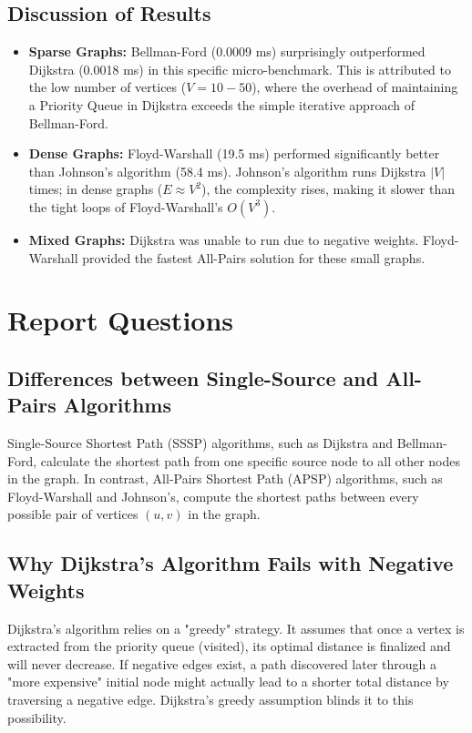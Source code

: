 \documentclass[12pt, a4paper]{article}
\begin{document}
\subsection{Discussion of Results}
\begin{itemize}
    \item \textbf{Sparse Graphs:} Bellman-Ford (0.0009 ms) surprisingly outperformed Dijkstra (0.0018 ms) in this specific micro-benchmark. This is attributed to the low number of vertices ($V=10-50$), where the overhead of maintaining a Priority Queue in Dijkstra exceeds the simple iterative approach of Bellman-Ford.
    \item \textbf{Dense Graphs:} Floyd-Warshall (19.5 ms) performed significantly better than Johnson’s algorithm (58.4 ms). Johnson's algorithm runs Dijkstra $|V|$ times; in dense graphs ($E \approx V^2$), the complexity rises, making it slower than the tight loops of Floyd-Warshall's $O(V^3)$.
    \item \textbf{Mixed Graphs:} Dijkstra was unable to run due to negative weights. Floyd-Warshall provided the fastest All-Pairs solution for these small graphs.
\end{itemize}

\section{Report Questions}

\subsection{Differences between Single-Source and All-Pairs Algorithms}
Single-Source Shortest Path (SSSP) algorithms, such as Dijkstra and Bellman-Ford, calculate the shortest path from one specific source node to all other nodes in the graph. In contrast, All-Pairs Shortest Path (APSP) algorithms, such as Floyd-Warshall and Johnson’s, compute the shortest paths between every possible pair of vertices $(u, v)$ in the graph.

\subsection{Why Dijkstra's Algorithm Fails with Negative Weights}
Dijkstra’s algorithm relies on a "greedy" strategy. It assumes that once a vertex is extracted from the priority queue (visited), its optimal distance is finalized and will never decrease. If negative edges exist, a path discovered later through a "more expensive" initial node might actually lead to a shorter total distance by traversing a negative edge. Dijkstra’s greedy assumption blinds it to this possibility.
\end{document}
